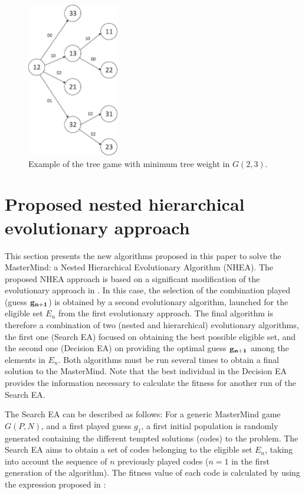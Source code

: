 \begin{figure}[!ht]
\begin{center}
\includegraphics[draft=false,angle=0,width=4cm]{./arbol_peso21.eps}
\end{center}
\caption{\label{TreeGame21} Example of the tree game with minimum tree weight in $G(2,3)$.}
\end{figure}


\section{Proposed nested hierarchical evolutionary approach}
\label{ss:bs}

This section presents the new algorithms proposed in this paper to solve the MasterMind: a Nested Hierarchical Evolutionary Algorithm (NHEA).
The proposed NHEA approach is based on a significant modification of the
evolutionary approach in \cite{Berghman09}. In this case, the selection of the combination played (guess ${\bf g_{n+1}}$)
is obtained by a second evolutionary algorithm, launched for the eligible set $E_n$
from the first evolutionary approach. The final algorithm is therefore a combination of two (nested and hierarchical) evolutionary algorithms,
the first one (Search EA) focused on obtaining the best possible eligible set, and the second one (Decision EA) on providing the optimal guess ${\bf g_{n+1}}$
among the elements in $E_n$. Both algorithms must be run several times to obtain a final solution to the MasterMind. Note that the best individual in the Decision EA provides the information necessary to calculate the fitness for another run of the Search EA.

The Search EA can be described as follows:
For a generic MasterMind game $G(P,N)$, and a first played guess $g_1$, a first initial population is randomly generated containing the different tempted solutions (codes) to the problem. The Search EA aims to obtain a set of codes belonging to the eligible set $E_n$, taking into account the sequence of $n$ previously played codes ($n=1$ in the first generation of the algorithm). The fitness value of each code is calculated by using the expression proposed in \cite{Berghman09}:

